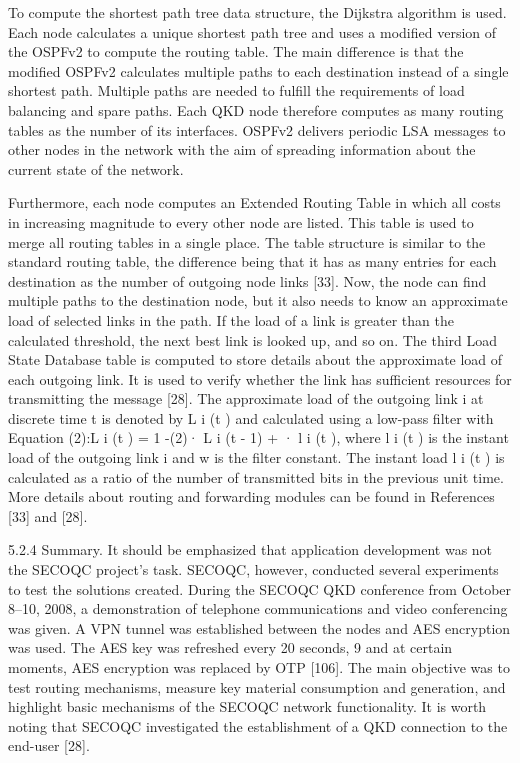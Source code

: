 To compute the shortest path tree data structure, the Dijkstra algorithm is used. Each node calculates a unique shortest path tree and uses a modified version of the OSPFv2 to compute the routing table. The main difference is that the modified OSPFv2 calculates multiple paths to each destination instead of a single shortest path. Multiple paths are needed to fulfill the requirements of load balancing and spare paths. Each QKD node therefore computes as many routing tables as the number of its interfaces. OSPFv2 delivers periodic LSA messages to other nodes in the network with the aim of spreading information about the current state of the network.

Furthermore, each node computes an Extended Routing Table in which all costs in increasing magnitude to every other node are listed. This table is used to merge all routing tables in a single place. The table structure is similar to the standard routing table, the difference being that it has as many entries for each destination as the number of outgoing node links [33]. Now, the node can find multiple paths to the destination node, but it also needs to know an approximate load of selected links in the path. If the load of a link is greater than the calculated threshold, the next best link is looked up, and so on. The third Load State Database table is computed to store details about the approximate load of each outgoing link. It is used to verify whether the link has sufficient resources for transmitting the message [28]. The approximate load of the outgoing link i at discrete time t is denoted by L i (t ) and calculated using a low-pass filter with Equation (2):L i (t ) = 1 -(2)· L i (t - 1) + · l i (t ), where l i (t ) is the instant load of the outgoing link i and w is the filter constant. The instant load l i (t ) is calculated as a ratio of the number of transmitted bits in the previous unit time. More details about routing and forwarding modules can be found in References [33] and [28].


5.2.4 Summary. It should be emphasized that application development was not the SECOQC project’s task. SECOQC, however, conducted several experiments to test the solutions created. During the SECOQC QKD conference from October 8–10, 2008, a demonstration of telephone communications and video conferencing was given. A VPN tunnel was established between the nodes and AES encryption was used. The AES key was refreshed every 20 seconds, 9 and at certain moments, AES encryption was replaced by OTP [106]. The main objective was to test routing mechanisms, measure key material consumption and generation, and highlight basic mechanisms of the SECOQC network functionality. It is worth noting that SECOQC investigated the establishment of a QKD connection to the end-user [28].

